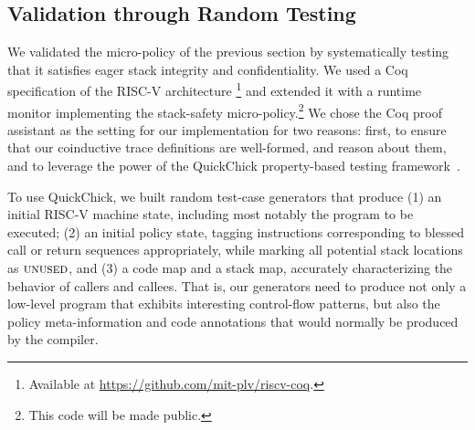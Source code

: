 \documentclass[acmsmall,review,anonymous]{acmart}\settopmatter{printfolios=true,printccs=false,printacmref=false}
\begin{document}


\subsection{Validation through Random Testing}
\label{sec:testing}

We validated the micro-policy of the previous section by
systematically testing that it satisfies eager stack integrity and
confidentiality. We used a Coq specification of the RISC-V
architecture
\footnote{Available at \url{https://github.com/mit-plv/riscv-coq}.}
  and extended it with a
runtime monitor implementing the stack-safety
micro-policy.\footnote{This code will be made public. } We
  chose the Coq proof assistant as the setting for our implementation
  for two reasons: first, to ensure that our coinductive trace
  definitions are well-formed, and reason about them, and to leverage the power of the
  QuickChick property-based testing framework~\citep{Pierce:SF4}.

To use QuickChick, we built random test-case generators that produce
(1) an initial RISC-V machine state, including most notably
  the program to be executed;
(2)
  an initial policy state, tagging instructions corresponding to
  blessed call or return sequences appropriately, while marking
  all potential stack locations as $\textsc{unused}$, and
(3)
 a code map and a stack map, accurately characterizing the behavior
  of callers and callees.
%
That is, our generators need to produce not only a low-level program
that exhibits interesting control-flow patterns, but also the policy
meta-information and code annotations that would normally be produced
by the compiler.
\end{document}
